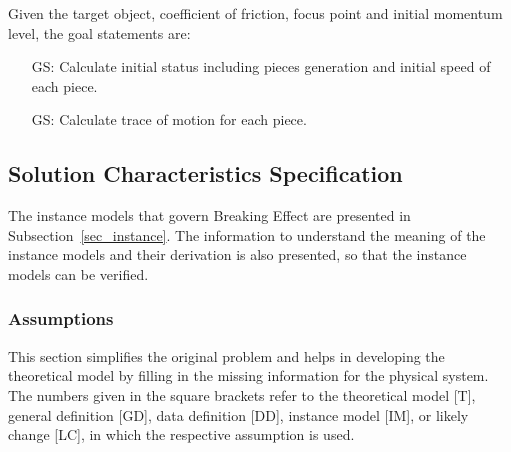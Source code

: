 \documentclass[12pt]{article}
\newcounter{goalnum} %
\newcommand{\progname}{Breaking Effect} %
\begin{document}
\noindent Given the target object, coefficient of friction, focus point and initial momentum level, the goal statements are:

\begin{itemize}

\item[GS\refstepcounter{goalnum}\thegoalnum \label{G_speed}:] Calculate initial status including pieces generation and initial speed of each piece.​

\item[GS\refstepcounter{goalnum}\thegoalnum \label{G_motion}:] Calculate trace of motion for each piece.

\end{itemize}

\subsection{Solution Characteristics Specification}

The instance models that govern \progname{} are presented in
Subsection~\ref{sec_instance}.  The information to understand the meaning of the
instance models and their derivation is also presented, so that the instance
models can be verified.

\subsubsection{Assumptions}

This section simplifies the original problem and helps in developing the
theoretical model by filling in the missing information for the physical
system. The numbers given in the square brackets refer to the theoretical model
[T], general definition [GD], data definition [DD], instance model [IM], or
likely change [LC], in which the respective assumption is used.
\end{document}
